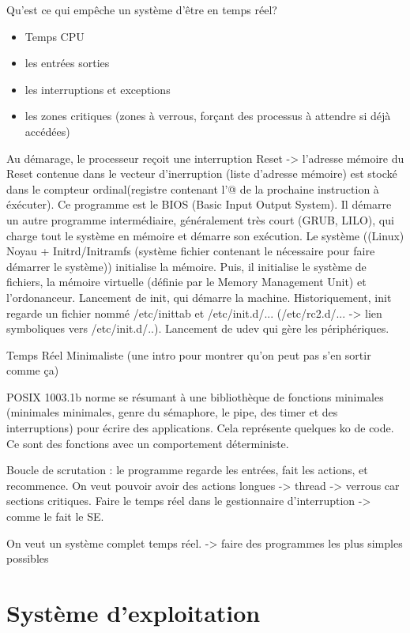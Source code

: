 \documentclass{article}
\begin{document}
Qu'est ce qui empêche un système d'être en temps réel?
\begin{itemize}
	\item Temps CPU
	\item les entrées sorties
	\item les interruptions et exceptions
	\item les zones critiques (zones à verrous, forçant des processus à attendre si déjà accédées)
\end{itemize}

Au démarage, le processeur reçoit une interruption Reset -> l'adresse mémoire du Reset contenue dans le vecteur d'inerruption (liste d'adresse mémoire) est stocké dans le compteur ordinal(registre contenant l'@ de la prochaine instruction à éxécuter). Ce programme est le BIOS (Basic Input Output System). Il démarre un autre programme intermédiaire, généralement très court (GRUB, LILO), qui charge tout le système en mémoire et démarre son exécution.
Le système ((Linux) Noyau + Initrd/Initramfs (système fichier contenant le nécessaire pour faire démarrer le système)) initialise la mémoire. Puis, il initialise le système de fichiers, la mémoire virtuelle (définie par le Memory Management Unit) et l'ordonanceur. Lancement de init, qui démarre la machine. Historiquement, init regarde un fichier nommé /etc/inittab et /etc/init.d/...  (/etc/rc2.d/... -> lien symboliques vers /etc/init.d/..). Lancement de udev qui gère les périphériques.


Temps Réel Minimaliste
(une intro pour montrer qu'on peut pas s'en sortir comme ça)

POSIX 1003.1b norme se résumant à une bibliothèque de fonctions minimales (minimales minimales, genre du sémaphore, le pipe, des timer et des interruptions) pour écrire des applications. Cela représente quelques ko de code. Ce sont des fonctions avec un comportement déterministe.

Boucle de scrutation : le programme regarde les entrées, fait les actions, et recommence.
On veut pouvoir avoir des actions longues -> thread -> verrous car sections critiques.
Faire le temps réel dans le gestionnaire d'interruption -> comme le fait le SE.

On veut un système complet temps réel. -> faire des programmes les plus simples possibles


\section{Système d'exploitation}
\end{document}
